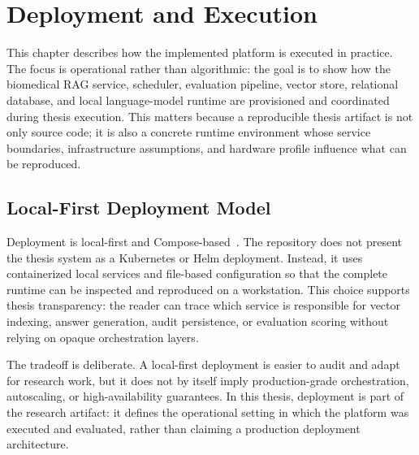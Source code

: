 \chapter{Deployment and Execution}
\label{chap:deployment}

This chapter describes how the implemented platform is executed in practice. The focus is operational rather than algorithmic: the goal is to show how the biomedical RAG service, scheduler, evaluation pipeline, vector store, relational database, and local language-model runtime are provisioned and coordinated during thesis execution. This matters because a reproducible thesis artifact is not only source code; it is also a concrete runtime environment whose service boundaries, infrastructure assumptions, and hardware profile influence what can be reproduced.

\section{Local-First Deployment Model}

Deployment is local-first and Compose-based~\cite{dockercompose2026docs}. The repository does not present the thesis system as a Kubernetes or Helm deployment. Instead, it uses containerized local services and file-based configuration so that the complete runtime can be inspected and reproduced on a workstation. This choice supports thesis transparency: the reader can trace which service is responsible for vector indexing, answer generation, audit persistence, or evaluation scoring without relying on opaque orchestration layers.

The tradeoff is deliberate. A local-first deployment is easier to audit and adapt for research work, but it does not by itself imply production-grade orchestration, autoscaling, or high-availability guarantees. In this thesis, deployment is part of the research artifact: it defines the operational setting in which the platform was executed and evaluated, rather than claiming a production deployment architecture.


